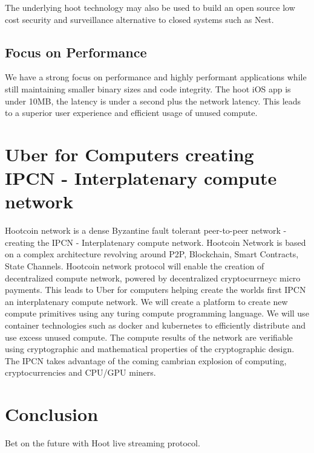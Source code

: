 \documentclass{article}
\begin{document}
The underlying hoot technology may also be used to build an open
source low cost security and surveillance alternative to closed systems
such as Nest.

\subsection{Focus on Performance}
We have a strong focus on performance and highly performant applications while still maintaining smaller binary sizes and  code integrity. The hoot iOS app is under 10MB, the latency is under a second plus the network latency. This leads to a superior user experience and efficient usage of unused compute.

\section{Uber for Computers creating IPCN - Interplatenary compute network}
Hootcoin network is a dense Byzantine fault tolerant peer-to-peer network - creating the IPCN - Interplatenary compute network.
Hootcoin Network is based on a complex architecture revolving around P2P, Blockchain, Smart Contracts, State Channels. Hootcoin network protocol will enable the creation of decentralized compute network, powered by decentralized cryptocurrneyc micro payments. This leads to Uber for computers helping create the worlds first IPCN an interplatenary compute network. We will create a platform to create new compute primitives using any turing compute programming language. We will use container technologies such as  docker and kubernetes to efficiently distribute and use excess unused compute. The compute results of the network are verifiable using cryptographic and mathematical properties of the cryptographic design. The IPCN takes advantage of the coming cambrian explosion of computing, cryptocurrencies and CPU/GPU miners.


\section{Conclusion}
Bet on the future with Hoot live streaming protocol.




\newpage
\listoffigures
\newpage 
\listoftables
\newpage 

\end{document}
